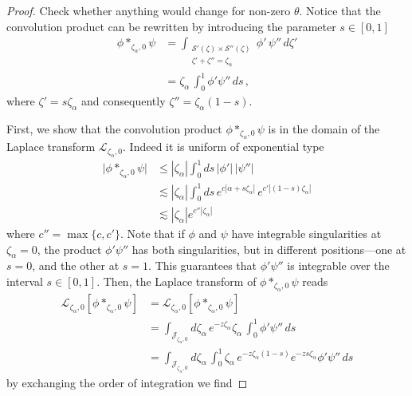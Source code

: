 \documentclass{article}
\newcommand{\laplace}{\mathcal{L}}
\theoremstyle{definition}
\theoremstyle{plain}
\newenvironment{todo}{\color{Coral}}{\color{black}}
\newenvironment{draft}{\color{SlateBlue}}{\color{black}}
\begin{document}
\begin{proof}
\begin{todo}Check whether anything would change for non-zero $\theta$.\end{todo} Notice that the convolution product can be rewritten by introducing the parameter $s\in [0,1]$
   \begin{align*}
       \phi \ast_{\zeta_\alpha,0} \psi &= \int_{\substack{\mathcal{S}'(\zeta) \times \mathcal{S}''(\zeta) \\ \zeta' + \zeta'' = \zeta_\alpha}} \phi'\,\psi''\,d\zeta'\\
       &=\zeta_\alpha\,\int_0^1 \phi' \psi''\,ds\,,
   \end{align*}
where $\zeta'=s\zeta_\alpha$ and consequently $\zeta''=\zeta_\alpha (1-s)$.

First, we show that the convolution product $\phi \ast_{\zeta_\alpha,0} \psi$ is in the domain of the Laplace transform $\laplace_{\zeta_\alpha,0}$. Indeed it is uniform of exponential type
\begin{align*}
   \big|\phi \ast_{\zeta_\alpha,0} \psi\big|&\leq |\zeta_\alpha|\int_0^1 ds \,|\phi'|\,|\psi''|\\
   &\lesssim |\zeta_\alpha| \int_0^1 ds\, e^{c |\alpha+s\zeta_\alpha|}\,e^{c'|(1-s)\zeta_\alpha|}\\
   & \lesssim |\zeta_\alpha|  e^{c'' |\zeta_\alpha|}
\end{align*}
where $c''=\max\{c,c'\}$. \begin{draft}Note that if $\phi$ and $\psi$ have integrable singularities at $\zeta_\alpha = 0$, the product $\phi' \psi''$ has both singularities, but in different positions---one at $s = 0$, and the other at $s = 1$. This guarantees that $\phi' \psi''$ is integrable over the interval $s \in [0, 1]$.\end{draft}
%   
Then, the Laplace transform of $\phi \ast_{\zeta_\alpha,0} \psi$ reads
     \begin{align*}
       \laplace_{\zeta_\alpha,0}[{\phi}\ast_{\zeta_\alpha,0}{\psi}]&=\laplace_{\zeta_\alpha,0}[{\phi}\ast_{\zeta_\alpha,0}{\psi}]\\
       &=\int_{\mathcal{J}_{\zeta_\alpha,0}}d\zeta_\alpha\,e^{-z\zeta_\alpha}\zeta_\alpha\, \int_0^1 \phi' \psi''\,ds \\
       &=\int_{\mathcal{J}_{\zeta_\alpha,0}}d\zeta_\alpha\, \int_0^1 \zeta_\alpha\,e^{-z\zeta_\alpha(1-s)} e^{-z s \zeta_\alpha} \phi' \psi''\,ds 
   \end{align*}
   by exchanging the order of integration we find 

\end{proof}
\end{document}
